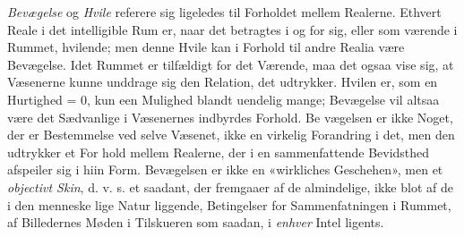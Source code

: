 \documentclass[12pt,a4paper]{book}
\begin{document}
\emph{Bevægelse} og \emph{Hvile} referere sig ligeledes til Forholdet
mellem Realerne. Ethvert Reale i det intelligible Rum er,
naar det betragtes i og for sig, eller som værende i Rummet,
hvilende; men denne Hvile kan i Forhold til andre Realia
være Bevægelse. Idet Rummet er tilfældigt for det Værende,
maa det ogsaa vise sig, at Væsenerne kunne unddrage sig den
Relation, det udtrykker. Hvilen er, som en Hurtighed = 0,
kun een Mulighed blandt uendelig mange; Bevægelse vil altsaa
være det Sædvanlige i Væsenernes indbyrdes Forhold. Be\-%
vægelsen er ikke Noget, der er Bestemmelse ved selve Væsenet,
ikke en virkelig Forandring i det, men den udtrykker et For\-%
hold mellem Realerne, der i en sammenfattende Bevidsthed
afspeiler sig i hiin Form. Bevægelsen er ikke en «wirkliches
Geschehen», men et \emph{objectivt Skin}, d. v. s. et saadant, der
fremgaaer af de almindelige, ikke blot af de i den menneske\-%
lige Natur liggende, Betingelser for Sammenfatningen i Rummet,
af Billedernes Møden i Tilskueren som saadan, i \emph{enhver} Intel\-%
ligents.
\end{document}
